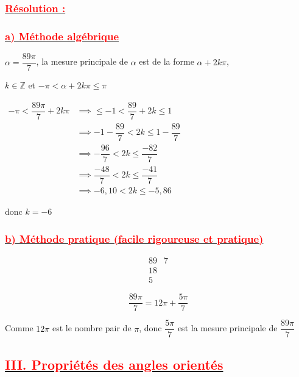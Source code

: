 \documentclass[a4paper,12pt]{article}
\begin{document}
\subsubsection*{\underline{\textcolor{red}{Résolution :}}}

\subsubsection*{\underline{\textcolor{red}{a) Méthode algébrique}}}

\(
\alpha = \dfrac{89\pi}{7}
\), la mesure principale de \( \alpha \) est de la forme \( \alpha + 2k\pi \),

\( k \in \mathbb{Z} \) et \( -\pi < \alpha + 2k\pi \leq \pi \)

\(
\begin{aligned}
    -\pi < \dfrac{89\pi}{7} + 2k\pi & \implies \leq  -1 <  \dfrac{89}{7} + 2k \leq 1          \\
                                    & \implies -1 - \dfrac{89}{7} < 2k \leq 1 - \dfrac{89}{7} \\
                                    & \implies -\dfrac{96}{7} < 2k \leq \dfrac{-82}{7}        \\
                                    & \implies \dfrac{-48}{7} < 2k \leq \dfrac{-41}{7}        \\
                                    & \implies -6{,}10 < 2k \leq -5{,}86
\end{aligned}
\)

donc $\boxed{k =-6}$

\subsubsection*{\underline{\textcolor{red}{b) Méthode pratique (facile rigoureuse et pratique)}}}

\[
    \begin{array}{c|c}
        89 & 7 \\
        \hline
        18 &   \\
        5  &
    \end{array}
\]

\[
    \dfrac{89\pi}{7} = 12\pi + \dfrac{5\pi}{7}
\]

Comme \( 12\pi \) est le nombre pair de \( \pi \), donc \( \dfrac{5\pi}{7} \) est la mesure principale de \( \dfrac{89\pi}{7} \)

\subsection*{\underline{\textcolor{red}{III. Propriétés des angles orientés}}}
\end{document}
